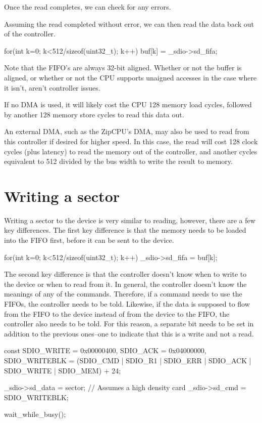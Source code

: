 \documentclass{gqtekspec}
\begin{document}
Once the read completes, we can check for any errors.

Assuming the read completed without error, we can then read the data back
out of the controller.

\begin{zCpp}
	for(int k=0; k<512/sizeof(uint32_t); k++)
		buf[k] = _sdio->sd_fifa;
\end{zCpp}

Note that the FIFO's are always 32-bit aligned.  Whether or not the buffer
is aligned, or whether or not the CPU supports unaigned accesses in the
case where it isn't, aren't controller issues.

If no DMA is used, it will likely cost the CPU 128 memory load cycles, followed
by another 128 memory store cycles to read this data out.

An external DMA, such as the ZipCPU's DMA, may also be used to read from this
controller if desired for higher speed.  In this case, the read will cost 128
clock cycles (plus latency) to read the memory out of the controller, and
another cycles equivalent to 512 divided by the bus width to write the result
to memory.
\section{Writing a sector}
Writing a sector to the device is very similar to reading, however, there
are a few key differences.  The first key difference is that the memory
needs to be loaded into the FIFO first, before it can be sent to the device.
\begin{zCpp}
	for(int k=0; k<512/sizeof(uint32_t); k++)
		_sdio->sd_fifa = buf[k];
\end{zCpp}

The second key difference is that the controller doesn't know when to write
to the device or when to read from it.  In general, the controller doesn't
know the meanings of any of the commands.  Therefore, if a command needs to
use the FIFOs, the controller needs to be told.  Likewise, if the data is
supposed to flow from the FIFO to the device instead of from the device to
the FIFO, the controller also needs to be told.  For this reason, a separate
bit needs to be set in addition to the previous ones--one to indicate that
this is a write and not a read.

\begin{zCpp}
	const	SDIO_WRITE    = 0x00000400,
		SDIO_ACK      = 0x04000000,
		SDIO_WRITEBLK = (SDIO_CMD | SDIO_R1 | SDIO_ERR
				| SDIO_ACK | SDIO_WRITE | SDIO_MEM) + 24;

	_sdio->sd_data = sector;	// Assumes a high density card
	_sdio->sd_cmd  = SDIO_WRITEBLK;

	wait_while_busy();
\end{zCpp}
\end{document}
